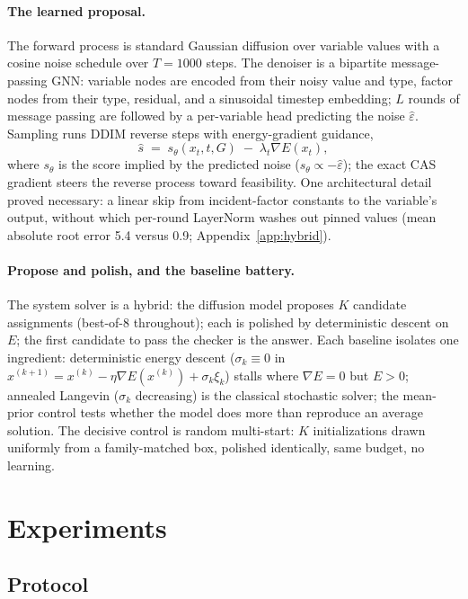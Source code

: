 \documentclass[letterpaper]{article} %
\begin{document}
\paragraph{The learned proposal.}
The forward process is standard Gaussian diffusion over variable values with a cosine noise
schedule over $T = 1000$ steps. The denoiser is a bipartite message-passing GNN: variable
nodes are encoded from their noisy value and type, factor nodes from their type,
residual, and a sinusoidal timestep embedding; $L$ rounds of message
passing are followed by a per-variable head predicting the noise
$\hat{\varepsilon}$. Sampling runs DDIM reverse steps with energy-gradient guidance,
\begin{equation}
\hat{s} \;=\; s_\theta(x_t, t, G) \;-\; \lambda_t \nabla E(x_t),
\end{equation}
where $s_\theta$ is the score implied by the predicted noise ($s_\theta \propto
-\hat{\varepsilon}$); the exact CAS gradient steers the reverse process toward feasibility.
One architectural detail proved necessary: a linear skip from incident-factor constants
to the variable's output, without which per-round LayerNorm washes out pinned values
(mean absolute root error 5.4 versus 0.9; Appendix~\ref{app:hybrid}).

\paragraph{Propose and polish, and the baseline battery.}
The system solver is a hybrid: the diffusion model proposes $K$ candidate assignments
(best-of-8 throughout); each is polished by deterministic descent on $E$; the first candidate
to pass the checker is the answer. Each baseline isolates one ingredient: deterministic energy descent ($\sigma_k \equiv 0$ in
$x^{(k+1)} = x^{(k)} - \eta \nabla E(x^{(k)}) + \sigma_k \xi_k$) stalls where
$\nabla E = 0$ but $E > 0$; annealed Langevin ($\sigma_k$ decreasing) is the classical
stochastic solver; the mean-prior control tests whether the model does more than reproduce
an average solution. The decisive control is random multi-start: $K$ initializations drawn
uniformly from a family-matched box, polished identically, same budget, no learning.

\section{Experiments}
\label{sec:experiments}

\subsection{Protocol}
\label{sec:entrapment}
\end{document}
